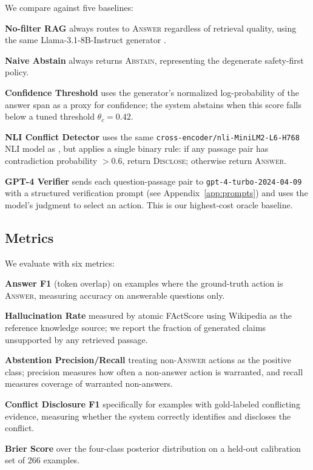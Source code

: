 We compare \method{} against five baselines:

\textbf{No-filter RAG} always routes to \textsc{Answer} regardless of retrieval quality, using the same Llama-3.1-8B-Instruct generator \citep{dubey2024llama3}.

\textbf{Naive Abstain} always returns \textsc{Abstain}, representing the degenerate safety-first policy.

\textbf{Confidence Threshold} uses the generator's normalized log-probability of the answer span as a proxy for confidence; the system abstains when this score falls below a tuned threshold $\theta_c = 0.42$.

\textbf{NLI Conflict Detector} uses the same \texttt{cross-encoder/nli-MiniLM2-L6-H768} NLI model as \method{}, but applies a single binary rule: if any passage pair has contradiction probability $> 0.6$, return \textsc{Disclose}; otherwise return \textsc{Answer}.

\textbf{GPT-4 Verifier} sends each question-passage pair to \texttt{gpt-4-turbo-2024-04-09} with a structured verification prompt (see Appendix~\ref{app:prompts}) and uses the model's judgment to select an action. This is our highest-cost oracle baseline.

\subsection{Metrics}

We evaluate with six metrics:

\textbf{Answer F1} (token overlap) \citep{rajpurkar2016squad} on examples where the ground-truth action is \textsc{Answer}, measuring accuracy on answerable questions only.

\textbf{Hallucination Rate} measured by atomic FActScore \citep{factscore2023} using Wikipedia as the reference knowledge source; we report the fraction of generated claims unsupported by any retrieved passage.

\textbf{Abstention Precision/Recall} treating non-\textsc{Answer} actions as the positive class; precision measures how often a non-answer action is warranted, and recall measures coverage of warranted non-answers.

\textbf{Conflict Disclosure F1} specifically for examples with gold-labeled conflicting evidence, measuring whether the system correctly identifies and discloses the conflict.

\textbf{Brier Score} \citep{brier1950verification} over the four-class posterior distribution on a held-out calibration set of 266 examples.

